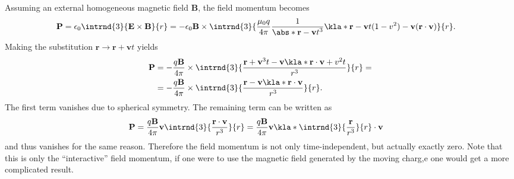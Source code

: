 \documentclass[english, parskip=full]{scrartcl}
\begin{document}
Assuming an external homogeneous magnetic field $\textbf{B}$, the field momentum becomes
\begin{align}
\textbf{P} &= \epsilon_0 \intrnd{3}{\textbf{E} \times \textbf{B}}{r} = -\epsilon_0 \textbf{B} \times \intrnd{3}{ \frac{\mu_0q}{4\pi} \frac{1}{\abs*{\textbf{r} - \textbf{v} t}^3} \kla*{ \textbf{r} - \textbf{v} t(1 - v^2) - \textbf{v} (\textbf{r} \cdot \textbf{v})} } {r}.
\end{align}
Making the substitution $\textbf{r} \rightarrow \textbf{r} + \textbf{v}t$ yields
\begin{align}
\textbf{P} &= -\frac{q\textbf{B}}{4\pi} \times \intrnd{3}{\frac{\textbf{r} + \textbf{v}^3t - \textbf{v} \kla*{ \textbf{r} \cdot \textbf{v} + v^2t}}{r^3} }{r} = \\
&= -\frac{q\textbf{B}}{4\pi} \times \intrnd{3}{\frac{\textbf{r} - \textbf{v} \kla*{ \textbf{r} \cdot \textbf{v} }}{r^3} }{r}.
\end{align}
The first term vanishes due to spherical symmetry.
The remaining term can be written as
\begin{align}
\textbf{P} &= \frac{q\textbf{B}}{4\pi} \textbf{v} \intrnd{3}{ \frac{\textbf{r} \cdot \textbf{v}}{r^3}  }{r} = \frac{q\textbf{B}}{4\pi} \textbf{v} \kla*{\intrnd{3}{ \frac{\textbf{r}}{r^3}  }{r} \cdot \textbf{v}}
\end{align}
and thus vanishes for the same reason.
Therefore the field momentum is not only time-independent, but actually exactly zero.
Note that this is only the ``interactive'' field momentum, if one were to use the magnetic field generated by the moving charg,e one would get a more complicated result.


\end{document}
